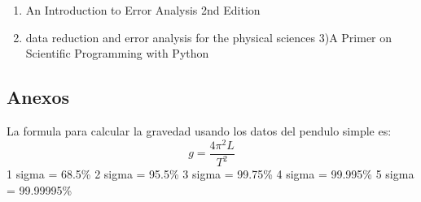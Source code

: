 \documentclass[
]{article}
\providecommand{\tightlist}{%
  \setlength{\itemsep}{0pt}\setlength{\parskip}{0pt}}
\begin{document}
\begin{enumerate}
\def\labelenumi{\arabic{enumi})}
\tightlist
\item
  An Introduction to Error Analysis 2nd Edition
\item
  data reduction and error analysis for the physical sciences 3)A Primer
  on Scientific Programming with Python
\end{enumerate}

\subsection{\texorpdfstring{\textbf{Anexos }}{Anexos }}\label{anexos}

La formula para calcular la gravedad usando los datos del pendulo simple
es: \[g=\frac{4\pi^2L}{T^2}\] 1 sigma = 68.5\% 2 sigma = 95.5\% 3 sigma
= 99.75\% 4 sigma = 99.995\% 5 sigma = 99.99995\%
\end{document}
